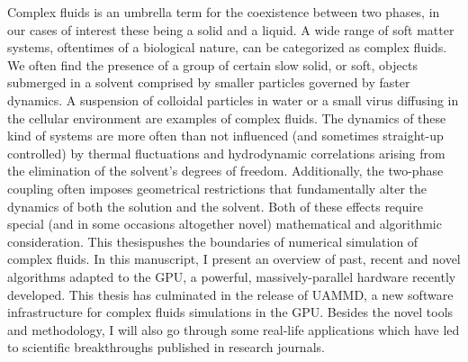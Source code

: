 \documentclass[twoside,openright,titlepage,numbers=noenddot,%
headinclude,footinclude,cleardoublepage=empty,abstract=on,
BCOR=5mm,fontsize=11pt, dvipsnames, paper=b5
]{scrreprt}
\begin{document}
Complex fluids is an umbrella term for the coexistence between two phases, in our cases of interest these being a solid and a liquid. A wide range of soft matter systems, oftentimes of a biological nature, can be categorized as complex fluids. We often find the presence of a group of certain slow solid, or soft, objects submerged in a solvent comprised by smaller particles governed by faster dynamics. A suspension of colloidal particles in water or a small virus diffusing in the cellular environment are examples of complex fluids. The dynamics of these kind of systems are more often than not influenced (and sometimes straight-up controlled) by thermal fluctuations and hydrodynamic correlations arising from the elimination of the solvent's degrees of freedom. Additionally, the two-phase coupling often imposes geometrical restrictions that fundamentally alter the dynamics of both the solution and the solvent. Both of these effects require special (and in some occasions altogether novel) mathematical and algorithmic consideration. This thesispushes the boundaries of numerical simulation of complex fluids. In this manuscript, I present an overview of past, recent and novel algorithms adapted to the GPU, a powerful, massively-parallel hardware recently developed. This thesis has culminated in the release of UAMMD, a new software infrastructure for complex fluids simulations in the GPU. Besides the novel tools and methodology, I will also go through some real-life applications which have led to scientific breakthroughs published in research journals.

\cleardoublepage
\newpage
\end{document}
